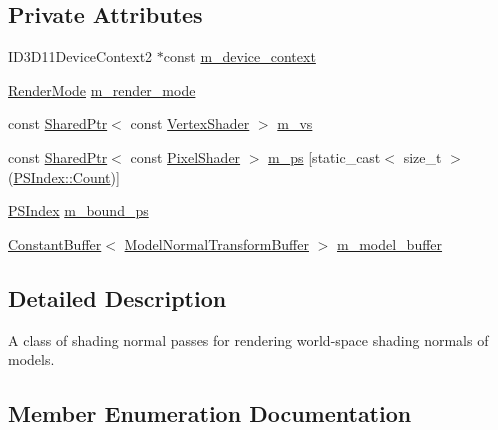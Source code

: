 \subsection*{Private Attributes}
\begin{DoxyCompactItemize}
\item 
I\+D3\+D11\+Device\+Context2 $\ast$const \hyperlink{classmage_1_1_shading_normal_pass_aa4172e272ab2da77b91cd01db60a10e3}{m\+\_\+device\+\_\+context}
\item 
\hyperlink{namespacemage_a5e7e18b0154373ce8fc942fe3f6b27fd}{Render\+Mode} \hyperlink{classmage_1_1_shading_normal_pass_a0048886bc80b9b39c1dc5d17e5b68584}{m\+\_\+render\+\_\+mode}
\item 
const \hyperlink{namespacemage_a1e01ae66713838a7a67d30e44c67703e}{Shared\+Ptr}$<$ const \hyperlink{classmage_1_1_vertex_shader}{Vertex\+Shader} $>$ \hyperlink{classmage_1_1_shading_normal_pass_a75c60d2d17deb2b87d97a094e4be7aa1}{m\+\_\+vs}
\item 
const \hyperlink{namespacemage_a1e01ae66713838a7a67d30e44c67703e}{Shared\+Ptr}$<$ const \hyperlink{namespacemage_a27ecaf266420ee7a494d64edc0757129}{Pixel\+Shader} $>$ \hyperlink{classmage_1_1_shading_normal_pass_a3dbbd1bd2612ccaec66c551f251a47e9}{m\+\_\+ps} \mbox{[}static\+\_\+cast$<$ size\+\_\+t $>$(\hyperlink{classmage_1_1_shading_normal_pass_a6d277753d26a7854c448b3e0d9275b19ae93f994f01c537c4e2f7d8528c3eb5e9}{P\+S\+Index\+::\+Count})\mbox{]}
\item 
\hyperlink{classmage_1_1_shading_normal_pass_a6d277753d26a7854c448b3e0d9275b19}{P\+S\+Index} \hyperlink{classmage_1_1_shading_normal_pass_aad8c7d37622cbd1dafd3dd49b590fd54}{m\+\_\+bound\+\_\+ps}
\item 
\hyperlink{structmage_1_1_constant_buffer}{Constant\+Buffer}$<$ \hyperlink{structmage_1_1_model_normal_transform_buffer}{Model\+Normal\+Transform\+Buffer} $>$ \hyperlink{classmage_1_1_shading_normal_pass_a948daea5dea9b2cd2b2eaf30a1341231}{m\+\_\+model\+\_\+buffer}
\end{DoxyCompactItemize}


\subsection{Detailed Description}
A class of shading normal passes for rendering world-\/space shading normals of models. 

\subsection{Member Enumeration Documentation}
\hypertarget{classmage_1_1_shading_normal_pass_a6d277753d26a7854c448b3e0d9275b19}{}\label{classmage_1_1_shading_normal_pass_a6d277753d26a7854c448b3e0d9275b19} 
